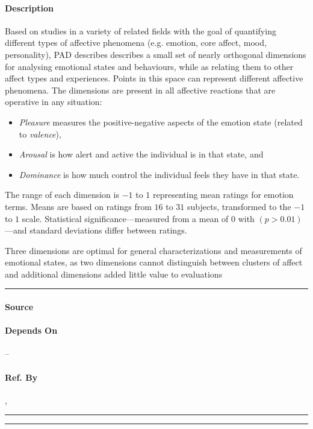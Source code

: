 \paragraph{Description} Based on studies in a variety of related fields with
the goal of quantifying different types of affective phenomena (e.g. emotion,
core affect, mood, personality), PAD describes describes a small set of nearly
orthogonal dimensions for analysing emotional states and behaviours, while as
relating them to other affect types and experiences. Points in this space can
represent different affective phenomena. The dimensions are present in all
affective reactions that are operative in any situation:
\begin{itemize}
    \item \textit{Pleasure} measures the positive-negative aspects of the
    emotion state (related to \textit{valence}),

    \item \textit{Arousal} is how alert and active the individual is in that
    state, and

    \item \textit{Dominance} is how much control the individual feels they have
    in that state.
\end{itemize}

The range of each dimension is $-1$ to $1$ representing mean ratings for
emotion terms. Means are based on ratings from $16$ to $31$ subjects,
transformed to the $-1$ to $1$ scale. Statistical significance---measured from
a mean of $0$ with $(p > 0.01)$---and standard deviations differ between
ratings.

Three dimensions are optimal for general characterizations and measurements of
emotional states, as two dimensions cannot distinguish between clusters of
affect and additional dimensions added little value to evaluations\\\hrule

\paragraph{Source} \cite{mehrabian1980basic, mehrabian1996pleasure}

\paragraph{Depends On} --

\paragraph{Ref. By} , 
\\\hrule\vspace{0.5mm}\hrule

